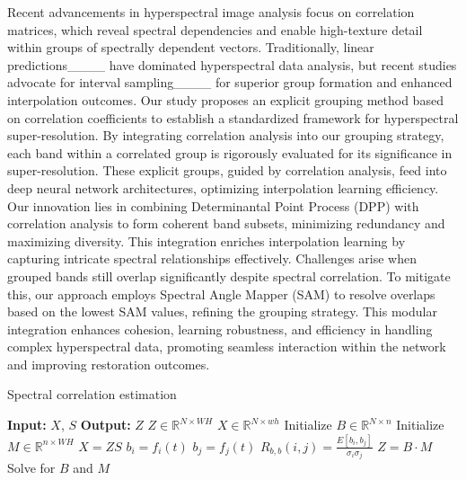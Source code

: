 Recent advancements in hyperspectral image analysis focus on correlation matrices, which reveal spectral dependencies and enable high-texture detail within groups of spectrally dependent vectors. Traditionally, linear predictions____ have dominated hyperspectral data analysis, but recent studies advocate for interval sampling____ for superior group formation and enhanced interpolation outcomes. Our study proposes an explicit grouping method based on correlation coefficients to establish a standardized framework for hyperspectral super-resolution. By integrating correlation analysis into our grouping strategy, each band within a correlated group is rigorously evaluated for its significance in super-resolution. These explicit groups, guided by correlation analysis, feed into deep neural network architectures, optimizing interpolation learning efficiency. Our innovation lies in combining Determinantal Point Process (DPP) with correlation analysis to form coherent band subsets, minimizing redundancy and maximizing diversity. This integration enriches interpolation learning by capturing intricate spectral relationships effectively. Challenges arise when grouped bands still overlap significantly despite spectral correlation. To mitigate this, our approach employs Spectral Angle Mapper (SAM) to resolve overlaps based on the lowest SAM values, refining the grouping strategy. This modular integration enhances cohesion, learning robustness, and efficiency in handling complex hyperspectral data, promoting seamless interaction within the network and improving restoration outcomes.
\begin{algorithm}
\caption{Spectral correlation estimation}
\label{algo: Algorithm1}
\begin{algorithmic}[1]
\State \textbf{Input:} \(X\), \(S\)
\State \textbf{Output:} \(Z\)
\State \(Z \in \mathbb{R}^{N \times WH}\)
\State \(X \in \mathbb{R}^{N \times wh}\)
\State Initialize \(B \in \mathbb{R}^{N \times n}\)
\State Initialize \(M \in \mathbb{R}^{n \times WH}\)
\State \(X = ZS\)
    \State \(b_i = f_i(t)\)
    \State \(b_j = f_j(t)\)
    \State \(R_{b,b}(i, j) = \frac{E[b_i, b_j]}{\sigma_i \sigma_j}\)
\EndFor
\State \(Z = B \cdot M\)
\State Solve for \(B\) and \(M\)
\end{algorithmic}
\end{algorithm}